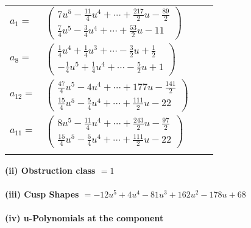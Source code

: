 \documentclass[1p]{elsarticle_modified}
\theoremstyle{definition}
\begin{document}
\begin{tabular}{m{7pt} m{180pt} m{7pt} m{180pt} }
\flushright $a_{1}=$&$\begin{pmatrix}7 u^5-\frac{11}{4} u^4+\cdots+\frac{217}{2} u-\frac{89}{2}\\\frac{7}{4} u^5-\frac{3}{4} u^4+\cdots+\frac{53}{2} u-11\end{pmatrix}$ \\
\flushright $a_{8}=$&$\begin{pmatrix}\frac{1}{4} u^4+\frac{1}{4} u^3+\cdots-\frac{3}{2} u+\frac{1}{2}\\-\frac{1}{4} u^5+\frac{1}{4} u^4+\cdots-\frac{5}{2} u+1\end{pmatrix}$ \\
\flushright $a_{12}=$&$\begin{pmatrix}\frac{47}{4} u^5-4 u^4+\cdots+177 u-\frac{141}{2}\\\frac{15}{4} u^5-\frac{5}{4} u^4+\cdots+\frac{111}{2} u-22\end{pmatrix}$ \\
\flushright $a_{11}=$&$\begin{pmatrix}8 u^5-\frac{11}{4} u^4+\cdots+\frac{243}{2} u-\frac{97}{2}\\\frac{15}{4} u^5-\frac{5}{4} u^4+\cdots+\frac{111}{2} u-22\end{pmatrix}$\\&\end{tabular}
\flushleft \textbf{(ii) Obstruction class $= 1$}\\~\\
\flushleft \textbf{(iii) Cusp Shapes $= -12 u^5+4 u^4-81 u^3+162 u^2-178 u+68$}\\~\\
\newpage\renewcommand{\arraystretch}{1}
\flushleft \textbf{(iv) u-Polynomials at the component}\newline \\
\end{document}

